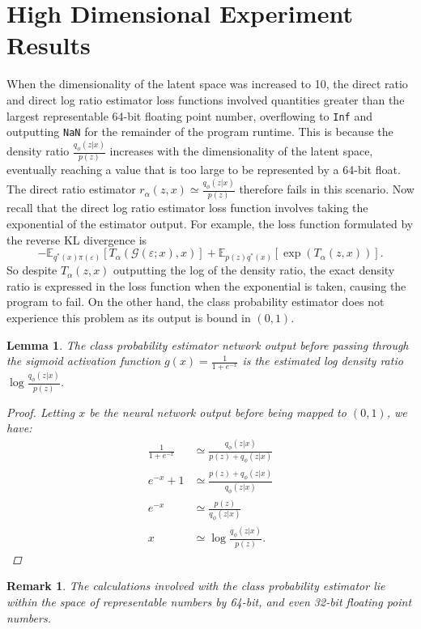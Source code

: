 \documentclass[honours,12pt]{unswthesis}
\newcommand{\E}{\mathbb{E}}
\newtheorem{lemma}[theorem]{Lemma}
\newtheorem{remark}[theorem]{Remark}
\numberwithin{equation}{section}
\theoremstyle{definition}
\begin{document}
\section{High Dimensional Experiment Results}
When the dimensionality of the latent space was increased to 10, the direct ratio and direct log ratio estimator loss functions involved quantities greater than the largest representable 64-bit floating point number, overflowing to \verb+Inf+ and outputting \verb+NaN+ for the remainder of the program runtime. This is because the density ratio $\frac{q_\phi(z|x)}{p(z)}$ increases with the dimensionality of the latent space, eventually reaching a value that is too large to be represented by a 64-bit float. The direct ratio estimator $r_\alpha(z,x)\simeq \frac{q_\phi(z|x)}{p(z)}$ therefore fails in this scenario. Now recall that the direct log ratio estimator loss function involves taking the exponential of the estimator output. For example, the loss function formulated by the reverse KL divergence is
\[-\E_{q^*(x)\pi(\varepsilon)}[T_\alpha(\mathcal{G}(\varepsilon;x),x)]+\E_{p(z)q^*(x)}[\exp(T_\alpha(z,x))].\]
So despite $T_\alpha(z,x)$ outputting the log of the density ratio, the exact density ratio is expressed in the loss function when the exponential is taken, causing the program to fail. On the other hand, the class probability estimator does not experience this problem as its output is bound in $(0,1)$.
\begin{lemma}
The class probability estimator network output before passing through the sigmoid activation function $g(x)=\frac{1}{1+e^{-x}}$ is the estimated log density ratio $\log \frac{q_\phi(z|x)}{p(z)}$.
\begin{proof}
Letting $x$ be the neural network output before being mapped to $(0,1)$, we have:
\begin{align*}
\frac{1}{1+e^{-x}}&\simeq\frac{q_\phi(z|x)}{p(z)+q_\phi(z|x)}\\
e^{-x}+1&\simeq\frac{p(z)+q_\phi(z|x)}{q_\phi(z|x)}\\
e^{-x}&\simeq\frac{p(z)}{q_\phi(z|x)}\\
x&\simeq\log \frac{q_\phi(z|x)}{p(z)}.
\end{align*}
\end{proof}
\end{lemma}
\begin{remark}
The calculations involved with the class probability estimator lie within the space of representable numbers by 64-bit, and even 32-bit floating point numbers.
\end{remark}
\end{document}
